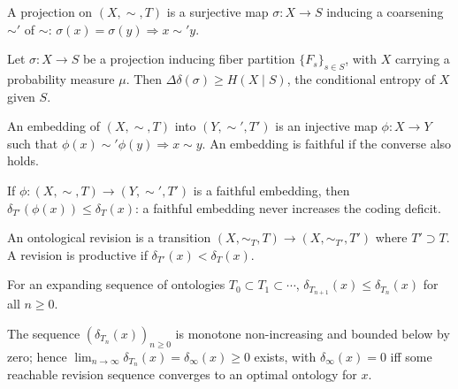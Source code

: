 \begin{definition}[Projection]
\label{def:dg-projection}
A projection on $(X, \sim, T)$ is a surjective map $\sigma: X \to S$ inducing
a coarsening $\sim'$ of $\sim$: $\sigma(x) = \sigma(y) \Rightarrow x \sim' y$.
\end{definition}

\begin{theorem}
\label{thm:projection-deficit-bound}
Let $\sigma: X \to S$ be a projection inducing fiber partition $\{F_s\}_{s \in
S}$, with $X$ carrying a probability measure $\mu$. Then $\Delta\delta(\sigma)
\ge H(X \mid S)$, the conditional entropy of $X$ given $S$.
\end{theorem}

\begin{definition}[Embedding]
\label{def:dg-embedding}
An embedding of $(X, \sim, T)$ into $(Y, \sim', T')$ is an injective map
$\phi: X \to Y$ such that $\phi(x) \sim' \phi(y) \Rightarrow x \sim y$. An
embedding is faithful if the converse also holds.
\end{definition}

\begin{theorem}
\label{thm:embedding-refinement}
If $\phi: (X,\sim,T) \to (Y,\sim',T')$ is a faithful embedding, then
$\delta_{T'}(\phi(x)) \le \delta_T(x)$: a faithful embedding never increases
the coding deficit.
\end{theorem}

\begin{definition}[Revision]
\label{def:dg-revision}
An ontological revision is a transition $(X, \sim_T, T) \to (X, \sim_{T'},
T')$ where $T' \supset T$. A revision is productive if $\delta_{T'}(x) <
\delta_T(x)$.
\end{definition}

\begin{theorem}
\label{thm:revision-monotonicity}
For an expanding sequence of ontologies $T_0 \subset T_1 \subset \cdots$,
$\delta_{T_{n+1}}(x) \le \delta_{T_n}(x)$ for all $n \ge 0$.
\end{theorem}

\begin{corollary}
\label{cor:asymptotic-deficit}
The sequence $(\delta_{T_n}(x))_{n \ge 0}$ is monotone non-increasing and
bounded below by zero; hence $\lim_{n\to\infty} \delta_{T_n}(x) = \delta_\infty(x)
\ge 0$ exists, with $\delta_\infty(x) = 0$ iff some reachable revision
sequence converges to an optimal ontology for $x$.
\end{corollary}


